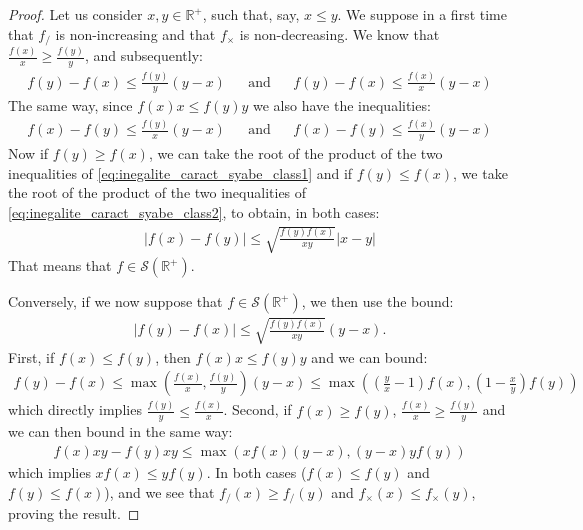 \documentclass[a4papaer, titlepage]{book}
\begin{document}
\begin{proof}%
  
  Let us consider $x,y \in \mathbb R^+$, such that, say, $x\leq y$. We suppose in a first time that $f_/$ is non-increasing and that $f_\times$ is non-decreasing.
  We know that $\frac{f(x)}{x} \geq \frac{f(y)}{y}$, and subsequently:
  \begin{align}\label{eq:inegalite_caract_syabe_class1}
    f(y) - f(x) \leq \frac{f(y)}{y}(y-x)&
    &\text{and}&
    &f(y) - f(x) \leq \frac{f(x)}{x}(y-x)
  \end{align}
  The same way, since $f(x)x \leq f(y)y$ we also have the inequalities:
  \begin{align}\label{eq:inegalite_caract_syabe_class2}
    f(x)-f(y) \leq \frac{f(y)}{x}(y-x)&
    &\text{and}&
    &f(x) - f(y) \leq \frac{f(x)}{y}(y-x)
  \end{align}
  Now if $f(y)\geq f(x)$, we can take the root of the product of the two inequalities of \eqref{eq:inegalite_caract_syabe_class1} and if $f(y)\leq f(x)$, we take the root of the product of the two inequalities of \eqref{eq:inegalite_caract_syabe_class2}, to obtain, in both cases:
  \begin{align*}
    \left\vert f(x)-f(y)\right\vert \leq \sqrt{\frac{f(y)f(x)}{xy}} \left\vert x-y\right\vert
  \end{align*}
  That means that $f\in \mathcal S(\mathbb R^+)$.

  Conversely, if we now suppose that $f\in \mathcal S(\mathbb R^+)$, we then use the bound:
  \begin{align*}
    \left\vert f(y) - f(x) \right\vert \leq \sqrt{\frac{f(y)f(x)}{xy}} (y-x).
  \end{align*}
  First, if $f(x) \leq f(y)$, then $f(x)x \leq f(y)y$ and we can bound:
  \begin{align*}
   f(y)-f(x)
   \leq\max \left( \frac{f(x)}{x}, \frac{f(y)}{y} \right) (y-x)
   \leq \max \left( \left( \frac{y}{x} - 1  \right)f(x), \left( 1-\frac{x}{y} \right) f(y) \right) &
  \end{align*}
  which directly implies $\frac{f(y)}{y}\leq \frac{f(x)}{x}$.
  Second, if $f(x) \geq f(y)$, $\frac{f(x)}{x} \geq \frac{f(y)}y$ and we can then bound in the same way:
  \begin{align*}
    f(x)xy- f(y)xy\leq \max \left( xf(x)(y-x), \left( y-x \right) yf(y) \right)
  \end{align*}
  which implies $xf(x) \leq yf(y)$.
  In both cases ($f(x) \leq f(y)$ and $f(y) \leq f(x)$), and we see that $f_/(x) \geq f_/(y)$ and $f_\times(x) \leq f_\times(y)$, proving the result.
  
\end{proof}
\end{document}
